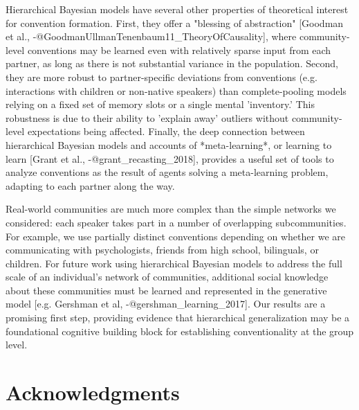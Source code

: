 \documentclass[11pt, floatsintext]{apa6}
\begin{document}
Hierarchical Bayesian models have several other properties of theoretical interest for convention formation.
First, they offer a "blessing of abstraction" [Goodman et al., -@GoodmanUllmanTenenbaum11_TheoryOfCausality], where community-level conventions may be learned even with relatively sparse input from each partner, as long as there is not substantial variance in the population. 
Second, they are more robust to partner-specific deviations from conventions (e.g. interactions with children or non-native speakers) than complete-pooling models relying on a fixed set of memory slots or a single mental 'inventory.' 
This robustness is due to their ability to 'explain away' outliers without community-level expectations being affected. 
Finally, the deep connection between hierarchical Bayesian models and accounts of *meta-learning*, or learning to learn [Grant et al., -@grant_recasting_2018], provides a useful set of tools to analyze conventions as the result of agents solving a meta-learning problem, adapting to each partner along the way.

Real-world communities are much more complex than the simple networks we considered: each speaker takes part in a number of overlapping subcommunities. 
For example, we use partially distinct conventions depending on whether we are communicating with psychologists, friends from high school, bilinguals, or children.
For future work using hierarchical Bayesian models to address the full scale of an individual's  network of communities, additional social knowledge about these communities must be learned and represented in the generative model [e.g. Gershman et al, -@gershman_learning_2017]. 
Our results are a promising first step, providing evidence that hierarchical generalization may be a foundational cognitive building block for establishing conventionality at the group level.


\section{\bf Acknowledgments}
\small



\end{document}
